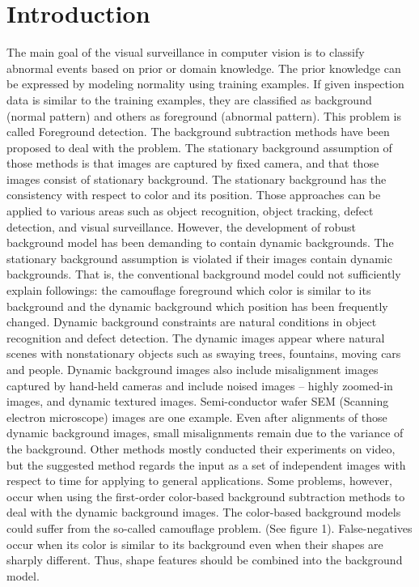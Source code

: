 \documentclass[a4paper,twocolumn, 10pt]{article}
\begin{document}
\section{Introduction}
The main goal of the visual surveillance in computer vision is to classify abnormal events based on prior or domain knowledge. The prior knowledge can be expressed by modeling normality using training examples. If given inspection data is similar to the training examples, they are classified as background (normal pattern) and others as foreground (abnormal pattern). This problem is called Foreground detection.
  The background subtraction methods have been proposed to deal with the problem. The stationary background assumption of those methods is that images are captured by fixed camera, and that those images consist of stationary background. The stationary background has the consistency with respect to color and its position. Those approaches can be applied to various areas such as object recognition, object tracking, defect detection, and visual surveillance.
  However, the development of robust background model has been demanding to contain dynamic backgrounds. The stationary background assumption is violated if their images contain dynamic backgrounds. That is, the conventional background model could not sufficiently explain followings: the camouflage foreground which color is similar to its background and the dynamic background which position has been frequently changed. 
  Dynamic background constraints are natural conditions in object recognition and defect detection. The dynamic images appear where natural scenes with nonstationary objects such as swaying trees, fountains, moving cars and people. Dynamic background images also include misalignment images captured by hand-held cameras and include noised images – highly zoomed-in images, and dynamic textured images. Semi-conductor wafer SEM (Scanning electron microscope) images are one example. Even after alignments of those dynamic background images, small misalignments remain due to the variance of the background. Other methods mostly conducted their experiments on video, but the suggested method regards the input as a set of independent images with respect to time for applying to general applications.       
Some problems, however, occur when using the first-order color-based background subtraction methods to deal with the dynamic background images. The color-based background models could suffer from the so-called camouflage problem. (See figure 1). False-negatives occur when its color is similar to its background even when their shapes are sharply different. Thus, shape features should be combined into the background model. 
\end{document}
